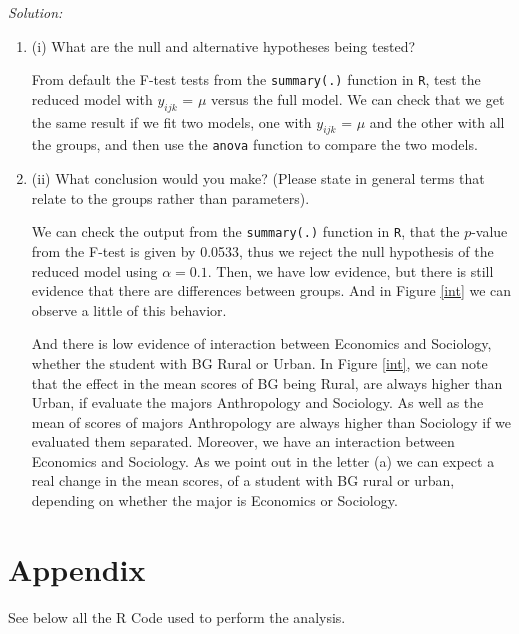 \documentclass[a4paper, 11pt]{article}
\begin{document}
\noindent
\textit{Solution:}\\

\begin{enumerate}
\item (i) What are the null and alternative hypotheses being tested?


From default the F-test tests from the \texttt{summary(.)} function in \texttt{R}, test the reduced model with $y_{ijk}$ = $\mu$ versus the full model. We can check that we get the same result if we fit two models, one with $y_{ijk}$ = $\mu$ and the other with all the groups, and then use the \texttt{anova} function to compare the two models.

\item (ii) What conclusion would you make? (Please state in general terms that relate to the
groups rather than parameters).

We can check the output from the \texttt{summary(.)} function in \texttt{R}, that the $p$-value from the F-test is given by 0.0533, thus we reject the null hypothesis of the reduced model using $\alpha = 0.1$. Then, we have low evidence, but there is still evidence that there are differences between groups. And in Figure \ref{int} we can observe a little of this behavior.

And there is low evidence of interaction between Economics and Sociology, whether the student with BG Rural or Urban. In Figure \ref{int}, we can note that the effect in the mean scores of BG being Rural, are always higher than Urban, if evaluate the majors Anthropology and Sociology. As well as the mean of scores of majors Anthropology are always higher than Sociology if we evaluated them separated. Moreover, we have an interaction between Economics and Sociology. As we point out in the letter (a) we can expect a real change in the mean scores, of a student with BG rural or urban, depending on whether the major is Economics or Sociology.
\end{enumerate}


\newpage
\section{Appendix}\label{code}

See below all the R Code used to perform the analysis.
\end{document}
